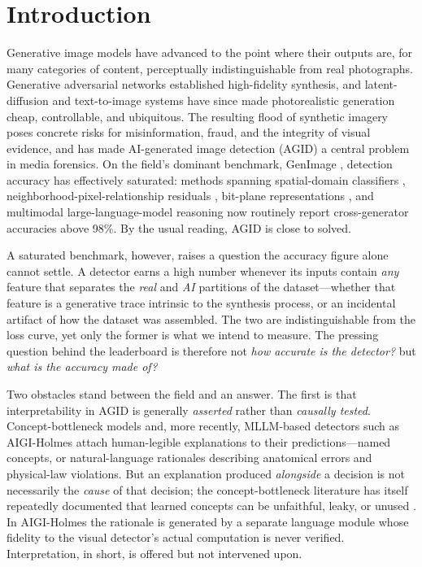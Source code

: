 \section{Introduction}

Generative image models have advanced to the point where their outputs are, for many categories of content, perceptually indistinguishable from real photographs. Generative adversarial networks \citep{brock2018biggan} established high-fidelity synthesis, and latent-diffusion and text-to-image systems \citep{rombach2022ldm, dhariwal2021adm, nichol2022glide} have since made photorealistic generation cheap, controllable, and ubiquitous. The resulting flood of synthetic imagery poses concrete risks for misinformation, fraud, and the integrity of visual evidence, and has made AI-generated image detection (AGID) a central problem in media forensics. On the field's dominant benchmark, GenImage \citep{zhu2023genimage}, detection accuracy has effectively saturated: methods spanning spatial-domain classifiers \citep{wang2020cnngenerated}, neighborhood-pixel-relationship residuals \citep{tan2024npr}, bit-plane representations \citep{wang2025lota}, and multimodal large-language-model reasoning \citep{zhou2025aigiholmes} now routinely report cross-generator accuracies above 98\%. By the usual reading, AGID is close to solved.

A saturated benchmark, however, raises a question the accuracy figure alone cannot settle. A detector earns a high number whenever its inputs contain \emph{any} feature that separates the \emph{real} and \emph{AI} partitions of the dataset---whether that feature is a generative trace intrinsic to the synthesis process, or an incidental artifact of how the dataset was assembled. The two are indistinguishable from the loss curve, yet only the former is what we intend to measure. The pressing question behind the leaderboard is therefore not \emph{how accurate is the detector?} but \emph{what is the accuracy made of?}

Two obstacles stand between the field and an answer. The first is that interpretability in AGID is generally \emph{asserted} rather than \emph{causally tested}. Concept-bottleneck models \citep{koh2020concept} and, more recently, MLLM-based detectors such as AIGI-Holmes \citep{zhou2025aigiholmes} attach human-legible explanations to their predictions---named concepts, or natural-language rationales describing anatomical errors and physical-law violations. But an explanation produced \emph{alongside} a decision is not necessarily the \emph{cause} of that decision; the concept-bottleneck literature has itself repeatedly documented that learned concepts can be unfaithful, leaky, or unused \citep{margeloiu2021concept, mahinpei2021promises, havasi2022addressing}. In AIGI-Holmes the rationale is generated by a separate language module whose fidelity to the visual detector's actual computation is never verified. Interpretation, in short, is offered but not intervened upon.

